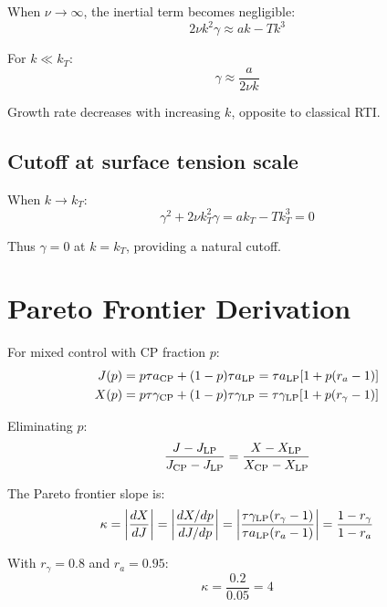\documentclass[aps,pre,twocolumn,showpacs,superscriptaddress]{revtex4-2}
\theoremstyle{definition}
\begin{document}
When $\nu \to \infty$, the inertial term becomes negligible:
\begin{equation}
2\nu k^2 \gamma \approx ak - Tk^3
\end{equation}

For $k \ll k_T$:
\begin{equation}
\gamma \approx \frac{a}{2\nu k}
\end{equation}

Growth rate decreases with increasing $k$, opposite to classical RTI.

\subsection{Cutoff at surface tension scale}

When $k \to k_T$:
\begin{equation}
\gamma^2 + 2\nu k_T^2 \gamma = ak_T - Tk_T^3 = 0
\end{equation}

Thus $\gamma = 0$ at $k = k_T$, providing a natural cutoff.

\section{Pareto Frontier Derivation}

For mixed control with CP fraction $p$:
\begin{align}
J(p) &= p\tau a_{\rm CP} + (1-p)\tau a_{\rm LP} = \tau a_{\rm LP}[1 + p(r_a - 1)] \\
X(p) &= p\tau \gamma_{\rm CP} + (1-p)\tau \gamma_{\rm LP} = \tau \gamma_{\rm LP}[1 + p(r_\gamma - 1)]
\end{align}

Eliminating $p$:
\begin{equation}
\frac{J - J_{\rm LP}}{J_{\rm CP} - J_{\rm LP}} = \frac{X - X_{\rm LP}}{X_{\rm CP} - X_{\rm LP}}
\end{equation}

The Pareto frontier slope is:
\begin{equation}
\kappa = \left|\frac{dX}{dJ}\right| = \left|\frac{dX/dp}{dJ/dp}\right| = \left|\frac{\tau\gamma_{\rm LP}(r_\gamma - 1)}{\tau a_{\rm LP}(r_a - 1)}\right| = \frac{1 - r_\gamma}{1 - r_a}
\end{equation}

With $r_\gamma = 0.8$ and $r_a = 0.95$:
\begin{equation}
\kappa = \frac{0.2}{0.05} = 4
\end{equation}
\end{document}

